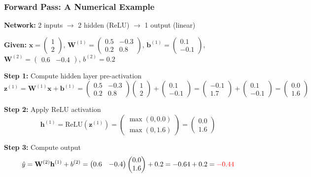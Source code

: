 \documentclass[notes,11pt, aspectratio=169]{beamer}
\newcommand{\vx}{\mathbf{x}}
\newcommand{\vb}{\mathbf{b}}
\newcommand{\vh}{\mathbf{h}}
\newcommand{\vz}{\mathbf{z}}
\newcommand{\vW}{\mathbf{W}}
\begin{document}
\begin{frame}
\frametitle{Forward Pass: A Numerical Example}

\textbf{Network:} 2 inputs $\to$ 2 hidden (ReLU) $\to$ 1 output (linear)

\vspace{4pt}
\textbf{Given:} $\vx = \begin{pmatrix}1\\2\end{pmatrix}$, \;
$\vW^{(1)} = \begin{pmatrix}0.5 & -0.3\\0.2 & 0.8\end{pmatrix}$, \;
$\vb^{(1)} = \begin{pmatrix}0.1\\-0.1\end{pmatrix}$, \;
$\vW^{(2)} = \begin{pmatrix}0.6 & -0.4\end{pmatrix}$, \;
$b^{(2)} = 0.2$

\vspace{6pt}
\textbf{Step 1:} Compute hidden layer pre-activation
\[
    \vz^{(1)} = \vW^{(1)}\vx + \vb^{(1)} = \begin{pmatrix}0.5 & -0.3\\0.2 & 0.8\end{pmatrix}\begin{pmatrix}1\\2\end{pmatrix} + \begin{pmatrix}0.1\\-0.1\end{pmatrix} = \begin{pmatrix}-0.1\\1.7\end{pmatrix} + \begin{pmatrix}0.1\\-0.1\end{pmatrix} = \begin{pmatrix}0.0\\1.6\end{pmatrix}
\]

\textbf{Step 2:} Apply ReLU activation
\[
    \vh^{(1)} = \text{ReLU}(\vz^{(1)}) = \begin{pmatrix}\max(0, 0.0)\\\max(0, 1.6)\end{pmatrix} = \begin{pmatrix}0.0\\1.6\end{pmatrix}
\]

\textbf{Step 3:} Compute output
\[
    \hat{y} = \vW^{(2)}\vh^{(1)} + b^{(2)} = \begin{pmatrix}0.6 & -0.4\end{pmatrix}\begin{pmatrix}0.0\\1.6\end{pmatrix} + 0.2 = -0.64 + 0.2 = \textcolor{red}{-0.44}
\]
\end{frame}
\end{document}
